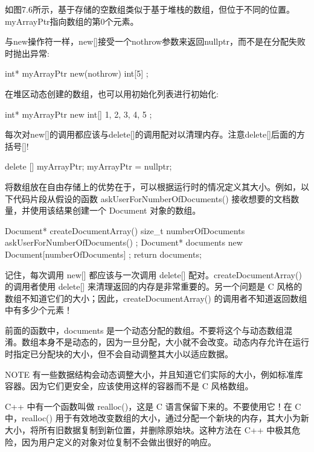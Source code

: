 如图7.6所示，基于存储的空数组类似于基于堆栈的数组，但位于不同的位置。myArrayPtr指向数组的第0个元素。

与new操作符一样，new[]接受一个nothrow参数来返回nullptr，而不是在分配失败时抛出异常:

\begin{cpp}
int* myArrayPtr { new(nothrow) int[5] };
\end{cpp}


在堆区动态创建的数组，也可以用初始化列表进行初始化:

\begin{cpp}
int* myArrayPtr { new int[] { 1, 2, 3, 4, 5 } };
\end{cpp}

每次对new[]的调用都应该与delete[]的调用配对以清理内存。注意delete[]后面的方括号[]!

\begin{cpp}
delete [] myArrayPtr;
myArrayPtr = nullptr;
\end{cpp}

将数组放在自由存储上的优势在于，可以根据运行时的情况定义其大小。例如，以下代码片段从假设的函数 askUserForNumberOfDocuments() 接收想要的文档数量，并使用该结果创建一个 Document 对象的数组。

\begin{cpp}
Document* createDocumentArray()
{
    size_t numberOfDocuments { askUserForNumberOfDocuments() };
    Document* documents { new Document[numberOfDocuments] };
    return documents;
}
\end{cpp}

记住，每次调用 new[] 都应该与一次调用 delete[] 配对。createDocumentArray() 的调用者使用 delete[] 来清理返回的内存是非常重要的。另一个问题是 C 风格的数组不知道它们的大小；因此，createDocumentArray() 的调用者不知道返回数组中有多少个元素！

前面的函数中，documents 是一个动态分配的数组。不要将这个与动态数组混淆。数组本身不是动态的，因为一旦分配，大小就不会改变。动态内存允许在运行时指定已分配块的大小，但不会自动调整其大小以适应数据。

\begin{myNotic}{NOTE}
有一些数据结构会动态调整大小，并且知道它们实际的大小，例如标准库容器。因为它们更安全，应该使用这样的容器而不是 C 风格数组。
\end{myNotic}

C++ 中有一个函数叫做 realloc()，这是 C 语言保留下来的。不要使用它！在 C 中，realloc() 用于有效地改变数组的大小，通过分配一个新块的内存，其大小为新大小，将所有旧数据复制到新位置，并删除原始块。这种方法在 C++ 中极其危险，因为用户定义的对象对位复制不会做出很好的响应。

